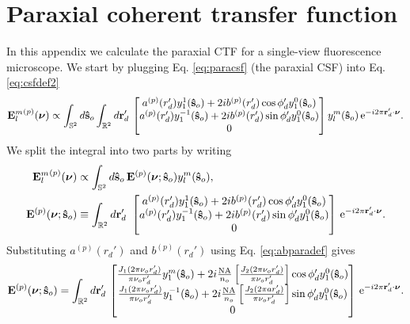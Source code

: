 \documentclass[11pt]{article}
\newcommand{\me}{\mathrm{e}}
\providecommand{\mb}[1]{\mathbf{#1}}
\providecommand{\so}[1]{\mathbf{\hat{s}}_o}
\providecommand{\rd}[1]{\mathbf{r}_d}
\providecommand{\bs}[1]{\boldsymbol{#1}}
\begin{document}
\section{Paraxial coherent transfer function}\label{paraxialctf}
In this appendix we calculate the paraxial CTF for a single-view fluorescence
microscope. We start by plugging Eq. \ref{eq:paracsf} (the paraxial CSF) into Eq.
\ref{eq:csfdef2}
\begin{align}
  {\mb{E}_l^m}^{(p)}(\bs{\nu}) \propto \int_{\mathbb{S}^2}d\so{}\int_{\mathbb{R}^2}d\rd{}'\,
\begin{bmatrix}
    a^{(p)}(r_d')y_1^{1}(\so{}) + 2ib^{(p)}(r_d')\cos\phi_d'y_1^{0}(\so{})\\
    a^{(p)}(r_d')y_1^{-1}(\so{}) + 2ib^{(p)}(r_d')\sin\phi_d'y_1^{0}(\so{})\\
    0\\
  \end{bmatrix}
  y_l^m(\so{})\thinspace\me^{-i 2\pi\rd{}'\cdot\bs{\nu}}. 
\end{align}
We split the integral into two parts by writing
\begin{align}
  {\mb{E}_l^m}^{(p)}(\bs{\nu}) &\propto \int_{\mathbb{S}^2}d\so{}\, \mb{E}^{(p)}(\bs{\nu};\so{}) y_l^m(\so{}),\\ \label{eq:splitup}
  \mb{E}^{(p)}(\bs{\nu};\so{}) &\equiv  \int_{\mathbb{R}^2}d\rd{}'\
\begin{bmatrix}
    a^{(p)}(r_d')y_1^{1}(\so{}) + 2ib^{(p)}(r_d')\cos\phi_d'y_1^{0}(\so{})\\
    a^{(p)}(r_d')y_1^{-1}(\so{}) + 2ib^{(p)}(r_d')\sin\phi_d'y_1^{0}(\so{})\\
    0\\
  \end{bmatrix}
  \thinspace\me^{-i 2\pi\rd{}'\cdot\bs{\nu}}. 
\end{align}
Substituting $a^{(p)}(r_d')$ and $b^{(p)}(r_d')$ using Eq. \ref{eq:abparadef} gives
\begin{align}
  \mb{E}^{(p)}(\bs{\nu}; \so{}) = \int_{\mathbb{R}^2}d\rd{}'\,
\begin{bmatrix}
    \frac{J_1(2\pi \nu_or_d')}{\pi \nu_or_d'}y_1^m(\so{}) + 2i\frac{\text{NA}}{n_o}\left[\frac{J_2(2\pi \nu_or_d')}{\pi \nu_or_d'}\right]\cos\phi_d'y_1^0(\so{})\\
    \frac{J_1(2\pi \nu_or_d')}{\pi \nu_or_d'}y_1^{-1}(\so{}) + 2i\frac{\text{NA}}{n_o}\left[\frac{J_2(2\pi ar_d')}{\pi \nu_or_d'}\right]\sin\phi_d'y_1^0(\so{})\\
    0\\
  \end{bmatrix}
  \thinspace\me^{-i 2\pi\rd{}'\cdot\bs{\nu}}.
\end{align}
\end{document}
